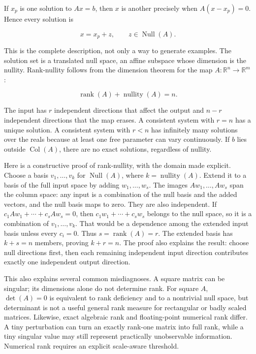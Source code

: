 If \(x_p\) is one solution to \(Ax=b\), then \(x\) is another precisely when \(A(x-x_p)=0\). Hence every solution is

\[
x=x_p+z,\qquad z\in\operatorname{Null}(A).
\]

This is the complete description, not only a way to generate examples. The solution set is a translated null space, an affine subspace whose dimension is the nullity. Rank-nullity follows from the dimension theorem for the map \(A:\mathbb R^n\to\mathbb R^m\):

\[
\operatorname{rank}(A)+\operatorname{nullity}(A)=n.
\]

The input has \(r\) independent directions that affect the output and \(n-r\) independent directions that the map erases. A consistent system with \(r=n\) has a unique solution. A consistent system with \(r<n\) has infinitely many solutions over the reals because at least one free parameter can vary continuously. If \(b\) lies outside \(\operatorname{Col}(A)\), there are no exact solutions, regardless of nullity.

Here is a constructive proof of rank-nullity, with the domain made explicit. Choose a basis \(v_1,\ldots,v_k\) for \(\operatorname{Null}(A)\), where \(k=\operatorname{nullity}(A)\). Extend it to a basis of the full input space by adding \(w_1,\ldots,w_s\). The images \(Aw_1,\ldots,Aw_s\) span the column space: any input is a combination of the null basis and the added vectors, and the null basis maps to zero. They are also independent. If \(c_1Aw_1+\cdots+c_sAw_s=0\), then \(c_1w_1+\cdots+c_sw_s\) belongs to the null space, so it is a combination of \(v_1,\ldots,v_k\). That would be a dependence among the extended input basis unless every \(c_i=0\). Thus \(s=\operatorname{rank}(A)=r\). The extended basis has \(k+s=n\) members, proving \(k+r=n\). The proof also explains the result: choose null directions first, then each remaining independent input direction contributes exactly one independent output direction.

This also explains several common misdiagnoses. A square matrix can be singular; its dimensions alone do not determine rank. For square \(A\), \(\det(A)=0\) is equivalent to rank deficiency and to a nontrivial null space, but determinant is not a useful general rank measure for rectangular or badly scaled matrices. Likewise, exact algebraic rank and floating-point numerical rank differ. A tiny perturbation can turn an exactly rank-one matrix into full rank, while a tiny singular value may still represent practically unobservable information. Numerical rank requires an explicit scale-aware threshold.

